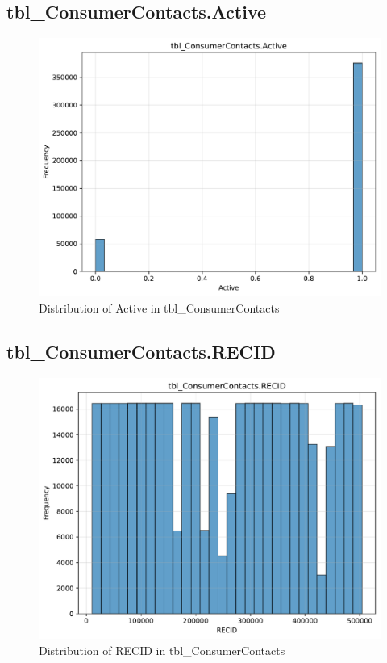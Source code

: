 \subsection{tbl\_ConsumerContacts.Active}

\begin{figure}[htbp]
\centering
\includegraphics[width=\textwidth]{figures/dbo_tbl_ConsumerContacts_Active.pdf}
\caption{Distribution of Active in tbl\_ConsumerContacts}
\end{figure}\newpage

\subsection{tbl\_ConsumerContacts.RECID}

\begin{figure}[htbp]
\centering
\includegraphics[width=\textwidth]{figures/dbo_tbl_ConsumerContacts_RECID.pdf}
\caption{Distribution of RECID in tbl\_ConsumerContacts}
\end{figure}\newpage

